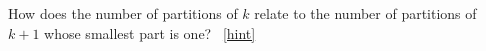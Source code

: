 \documentclass{book}
\begin{document}
\setcounter{project}{213}
\addtocounter{project}{-1}
\begin{activity}[]\label{activity-206}
\hypertarget{p-1176}{}%
How does the number of partitions of \(k\) relate to the number of partitions of \(k+1\) whose smallest part is one?%
~\hfill{\tiny\hyperlink{a-213}{[hint]}\hypertarget{q-213}{}}\end{activity}
\end{document}
